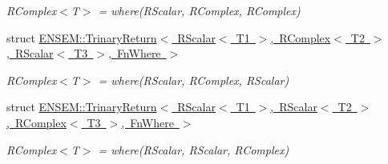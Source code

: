 \begin{DoxyCompactItemize}
\begin{DoxyCompactList}\small\item\em R\+Complex$<$\+T$>$ = where(\+R\+Scalar, R\+Complex, R\+Complex) \end{DoxyCompactList}\item 
struct \mbox{\hyperlink{structENSEM_1_1TrinaryReturn_3_01RScalar_3_01T1_01_4_00_01RComplex_3_01T2_01_4_00_01RScalar_3_01T3_01_4_00_01FnWhere_01_4}{E\+N\+S\+E\+M\+::\+Trinary\+Return$<$ R\+Scalar$<$ T1 $>$, R\+Complex$<$ T2 $>$, R\+Scalar$<$ T3 $>$, Fn\+Where $>$}}
\begin{DoxyCompactList}\small\item\em R\+Complex$<$\+T$>$ = where(\+R\+Scalar, R\+Complex, R\+Scalar) \end{DoxyCompactList}\item 
struct \mbox{\hyperlink{structENSEM_1_1TrinaryReturn_3_01RScalar_3_01T1_01_4_00_01RScalar_3_01T2_01_4_00_01RComplex_3_01T3_01_4_00_01FnWhere_01_4}{E\+N\+S\+E\+M\+::\+Trinary\+Return$<$ R\+Scalar$<$ T1 $>$, R\+Scalar$<$ T2 $>$, R\+Complex$<$ T3 $>$, Fn\+Where $>$}}
\begin{DoxyCompactList}\small\item\em R\+Complex$<$\+T$>$ = where(\+R\+Scalar, R\+Scalar, R\+Complex) \end{DoxyCompactList}\end{DoxyCompactItemize}
